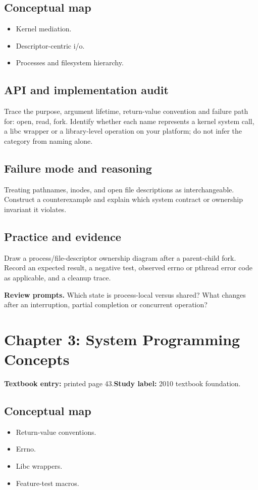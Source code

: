 \documentclass[11pt,letterpaper,oneside]{report}
\begin{document}
\subsection{Conceptual map}
\begin{itemize}
\item Kernel mediation.
\item Descriptor-centric i/o.
\item Processes and filesystem hierarchy.
\end{itemize}
\subsection{API and implementation audit}
Trace the purpose, argument lifetime, return-value convention and failure path for: open, read, fork. Identify whether each name represents a kernel system call, a libc wrapper or a library-level operation on your platform; do not infer the category from naming alone.

\subsection{Failure mode and reasoning}
Treating pathnames, inodes, and open file descriptions as interchangeable. Construct a counterexample and explain which system contract or ownership invariant it violates.

\subsection{Practice and evidence}
Draw a process/file-descriptor ownership diagram after a parent-child fork. Record an expected result, a negative test, observed errno or pthread error code as applicable, and a cleanup trace.

\textbf{Review prompts.} Which state is process-local versus shared? What changes after an interruption, partial completion or concurrent operation?

\section{Chapter 3: System Programming Concepts}
\textbf{Textbook entry:} printed page 43.\quad \textbf{Study label:} 2010 textbook foundation.

\subsection{Conceptual map}
\begin{itemize}
\item Return-value conventions.
\item Errno.
\item Libc wrappers.
\item Feature-test macros.
\end{itemize}
\end{document}
